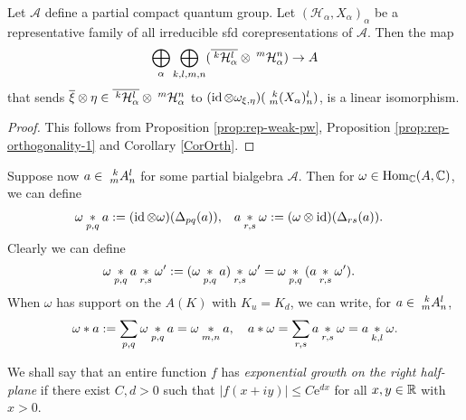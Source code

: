 \begin{Cor} \label{cor:rep-pw}
  Let $\mathscr{A}$ define a partial compact quantum group. Let
  $(\mathcal{H}_{\alpha},X_{\alpha})_{\alpha}$ be a representative
  family of all irreducible sfd corepresentations of
  $\mathscr{A}$. Then the map
  \begin{align*}
    \bigoplus_{\alpha} \bigoplus_{k,l,m,n}
    (\overline{\Gru{\mathcal{H}_{\alpha}}{k}{l}} \otimes
    \Gru{\mathcal{H}_{\alpha}}{m}{n}) \to A
  \end{align*}
  that sends $\overline{\xi} \otimes \eta \in
  \overline{\Gru{\mathcal{H}_{\alpha}}{k}{l}} \otimes
  \Gru{\mathcal{H}_{\alpha}}{m}{n}$ to $ (\id \otimes
  \omega_{\xi,\eta})(\Gr{(X_{\alpha})}{k}{l}{m}{n})$,
  is a linear isomorphism.
\end{Cor}
\begin{proof} This follows from Proposition \ref{prop:rep-weak-pw}, Proposition \ref{prop:rep-orthogonality-1} and Corollary \ref{CorOrth}.
\end{proof}

Suppose now $a\in \Gr{A}{k}{l}{m}{n}$ for some partial bialgebra $\mathscr{A}$. Then for $\omega \in \Hom_{\C}(A,\C)$, we can define
\begin{align*}
  \omega \aste{p,q} a
&:= (\id \otimes \omega) (\Delta_{pq}(a)), & a \aste{r,s}
\omega&:=(\omega \otimes \id)(\Delta_{rs}(a)).\end{align*} Clearly we can define
\begin{align*} \omega \aste{p,q} a \aste{r,s}
\omega'&:= (\omega \aste{p,q} a)\aste{r,s} \omega' = \omega \aste{p,q}(a \aste{r,s} \omega').\end{align*}
When $\omega$ has support on the $A(K)$ with $K_u=K_d$, we can write, for $a\in \Gr{A}{k}{l}{m}{n}$, \[\omega\ast a := \sum_{p,q} \omega\aste{p,q}a = \omega\aste{m,n}a,\quad  a\ast \omega = \sum_{r,s} a\aste{r,s}\omega = a\aste{k,l}\omega.\] 

We shall say that an entire function $f$ has \emph{exponential growth
  on the right half-plane} if there exist $C,d>0$ such that $|f(x+iy)|\leq
C\mathrm{e}^{dx}$  for all $x,y\in \R$ with $x>0$. 

